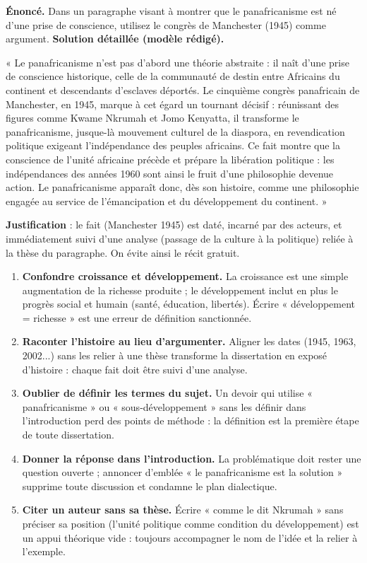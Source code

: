 \documentclass[11pt]{article}
\begin{document}
\begin{exoresolu}
\textbf{Énoncé.} Dans un paragraphe visant à montrer que le panafricanisme est né d'une prise de conscience, utilisez le congrès de Manchester (1945) comme argument.
\tcblower
\textbf{Solution détaillée (modèle rédigé).}

« Le panafricanisme n'est pas d'abord une théorie abstraite : il naît d'une prise de conscience historique, celle de la communauté de destin entre Africains du continent et descendants d'esclaves déportés. Le cinquième congrès panafricain de Manchester, en 1945, marque à cet égard un tournant décisif : réunissant des figures comme Kwame Nkrumah et Jomo Kenyatta, il transforme le panafricanisme, jusque-là mouvement culturel de la diaspora, en revendication politique exigeant l'indépendance des peuples africains. Ce fait montre que la conscience de l'unité africaine précède et prépare la libération politique : les indépendances des années 1960 sont ainsi le fruit d'une philosophie devenue action. Le panafricanisme apparaît donc, dès son histoire, comme une philosophie engagée au service de l'émancipation et du développement du continent. »

\textbf{Justification} : le fait (Manchester 1945) est daté, incarné par des acteurs, et immédiatement suivi d'une analyse (passage de la culture à la politique) reliée à la thèse du paragraphe. On évite ainsi le récit gratuit.
\end{exoresolu}

\begin{attention}
\begin{enumerate}
\item \textbf{Confondre croissance et développement.} La croissance est une simple augmentation de la richesse produite ; le développement inclut en plus le progrès social et humain (santé, éducation, libertés). Écrire « développement = richesse » est une erreur de définition sanctionnée.
\item \textbf{Raconter l'histoire au lieu d'argumenter.} Aligner les dates (1945, 1963, 2002...) sans les relier à une thèse transforme la dissertation en exposé d'histoire : chaque fait doit être suivi d'une analyse.
\item \textbf{Oublier de définir les termes du sujet.} Un devoir qui utilise « panafricanisme » ou « sous-développement » sans les définir dans l'introduction perd des points de méthode : la définition est la première étape de toute dissertation.
\item \textbf{Donner la réponse dans l'introduction.} La problématique doit rester une question ouverte ; annoncer d'emblée « le panafricanisme est la solution » supprime toute discussion et condamne le plan dialectique.
\item \textbf{Citer un auteur sans sa thèse.} Écrire « comme le dit Nkrumah » sans préciser sa position (l'unité politique comme condition du développement) est un appui théorique vide : toujours accompagner le nom de l'idée et la relier à l'exemple.
\end{enumerate}
\end{attention}
\end{document}
